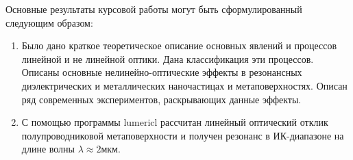 

Основные результаты курсовой работы могут быть сформулированный следующим образом:
\begin{enumerate}
\item Было дано краткое теоретическое описание основных явлений и процессов линейной и не линейной оптики. Дана классификация эти процессов. Описаны основные нелинейно-оптические эффекты в резонансных диэлектрических и металлических наночастицах и метаповерхностях. Описан ряд современных экспериментов, раскрывающих данные эффекты. 
\item С помощью программы lumericl рассчитан линейный оптический отклик полупроводниковой метаповерхности и получен резонанс в ИК-диапазоне на длине волны $ \lambda \approx  2$мкм.  
\end{enumerate}
